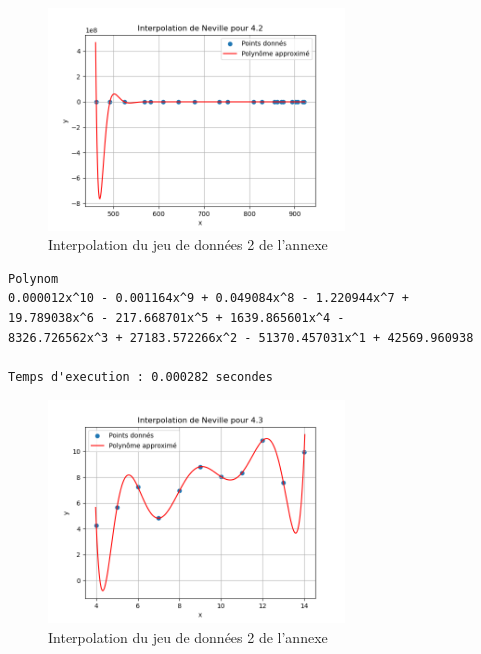 \documentclass{report}
\begin{document}
\begin{figure}[h]
    \centering
    \includegraphics[width=0.7\textwidth]{sources/Corentin/polynomApproch/results/graphs/42.png}
    \caption{Interpolation du jeu de données 2 de l'annexe}
\end{figure}
\newpage
\begin{lstlisting}[caption={Annexe 3 data} results, basicstyle=\fontsize{8}{10}\selectfont]
    Polynom
0.000012x^10 - 0.001164x^9 + 0.049084x^8 - 1.220944x^7 + 
19.789038x^6 - 217.668701x^5 + 1639.865601x^4 - 
8326.726562x^3 + 27183.572266x^2 - 51370.457031x^1 + 42569.960938

Temps d'execution : 0.000282 secondes
\end{lstlisting}
\begin{figure}[h]
    \centering
    \includegraphics[width=0.7\textwidth]{sources/Corentin/polynomApproch/results/graphs/43.png}
    \caption{Interpolation du jeu de données 2 de l'annexe}
\end{figure}
\newpage
\end{document}
